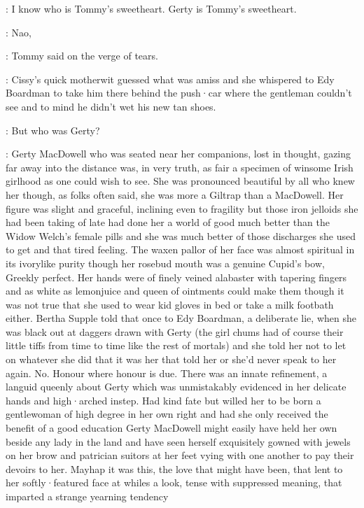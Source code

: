 \edy:
I know who is Tommy's sweetheart.
Gerty is Tommy's sweetheart.

\tommy:
Nao,

:
Tommy said
on the verge of tears.

:
Cissy's quick motherwit
guessed what was amiss
and she whispered to Edy Boardman
to take him there
behind the push·car
where the gentleman couldn't see
and to mind
he didn't wet his new tan shoes.

:
But who was Gerty?

:
Gerty MacDowell
who was seated near her companions,
lost in thought,
gazing far away into the distance
was,
in very truth,
as fair a specimen
of winsome Irish girlhood
as one could wish to see.
She was pronounced beautiful
by all who knew her
though,
as folks often said,
she was more a Giltrap than a MacDowell.
Her figure was slight and graceful,
inclining even to fragility
but those iron jelloids
she had been taking of late
had done her a world of good
much better than the Widow Welch's female pills
and she was much better
of those discharges she used to get
and that tired feeling.
The waxen pallor of her face
was almost spiritual
in its ivorylike purity
though her rosebud mouth was a genuine Cupid's bow,
Greekly perfect.
Her hands were of finely veined alabaster
with tapering fingers
and
as white as lemonjuice
and queen of ointments
could make them
though it was not true
that she used to wear kid gloves in bed
or take a milk footbath either.
Bertha Supple told that once
to Edy Boardman,
a deliberate lie,
when she was black out
at daggers drawn with Gerty
(the girl chums had
of course
their little tiffs
from time to time
like the rest of mortals)
and she told her
not to let on
whatever she did that
it was her that told her
or she'd never speak to her again.
No.
Honour where honour is due.
There was an innate refinement,
a languid queenly  about Gerty
which was unmistakably evidenced
in her delicate hands
and high·arched instep.
Had kind fate
but willed her
to be born a gentlewoman of high degree
in her own right
and had she only received the benefit of a good education
Gerty MacDowell might easily have held her own
beside any lady in the land
and have seen herself exquisitely gowned
with jewels on her brow
and patrician suitors at her feet
vying with one another to pay their devoirs to her.
Mayhap it was this,
the love that might have been,
that lent to her softly·featured face at whiles
a look,
tense with suppressed meaning,
that imparted a strange yearning tendency
